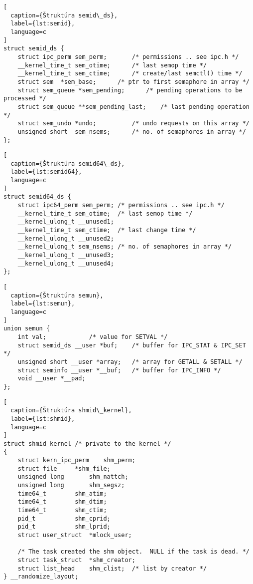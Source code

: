 \begin{lstlisting}[
  caption={Štruktúra semid\_ds},
  label={lst:semid},
  language=c
]
struct semid_ds {
	struct ipc_perm	sem_perm;		/* permissions .. see ipc.h */
	__kernel_time_t	sem_otime;		/* last semop time */
	__kernel_time_t	sem_ctime;		/* create/last semctl() time */
	struct sem	*sem_base;		/* ptr to first semaphore in array */
	struct sem_queue *sem_pending;		/* pending operations to be processed */
	struct sem_queue **sem_pending_last;	/* last pending operation */
	struct sem_undo	*undo;			/* undo requests on this array */
	unsigned short	sem_nsems;		/* no. of semaphores in array */
};
\end{lstlisting}
\begin{lstlisting}[
  caption={Štruktúra semid64\_ds},
  label={lst:semid64},
  language=c
]
struct semid64_ds {
	struct ipc64_perm sem_perm;	/* permissions .. see ipc.h */
	__kernel_time_t	sem_otime;	/* last semop time */
	__kernel_ulong_t __unused1;
	__kernel_time_t	sem_ctime;	/* last change time */
	__kernel_ulong_t __unused2;
	__kernel_ulong_t sem_nsems;	/* no. of semaphores in array */
	__kernel_ulong_t __unused3;
	__kernel_ulong_t __unused4;
};
\end{lstlisting}
\begin{lstlisting}[
  caption={Štruktúra semun},
  label={lst:semun},
  language=c
]
union semun {
	int val;			/* value for SETVAL */
	struct semid_ds __user *buf;	/* buffer for IPC_STAT & IPC_SET */
	unsigned short __user *array;	/* array for GETALL & SETALL */
	struct seminfo __user *__buf;	/* buffer for IPC_INFO */
	void __user *__pad;
};
\end{lstlisting}
\begin{lstlisting}[
  caption={Štruktúra shmid\_kernel},
  label={lst:shmid},
  language=c
]
struct shmid_kernel /* private to the kernel */
{	
	struct kern_ipc_perm	shm_perm;
	struct file		*shm_file;
	unsigned long		shm_nattch;
	unsigned long		shm_segsz;
	time64_t		shm_atim;
	time64_t		shm_dtim;
	time64_t		shm_ctim;
	pid_t			shm_cprid;
	pid_t			shm_lprid;
	struct user_struct	*mlock_user;

	/* The task created the shm object.  NULL if the task is dead. */
	struct task_struct	*shm_creator;
	struct list_head	shm_clist;	/* list by creator */
} __randomize_layout;
\end{lstlisting}
